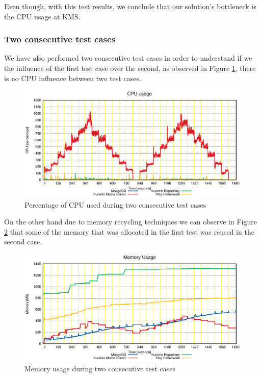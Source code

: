 Even though, with this test results, we conclude that our solution's bottleneck is the \ac{CPU} usage at \ac{KMS}.

\subsubsection{Two consecutive test cases}


We have also performed two consecutive test cases in order to understand if we the influence of the first test case over the second, as observed in Figure \ref{fig:test_two_times_cpu}, there is no \ac{CPU} influence between two test cases.


\begin{figure}
  \centering
  \includegraphics[width=\textwidth]{stats/test_two_times_cpu.eps}
  \caption{Percentage of CPU used during two consecutive test cases}
  \label{fig:test_two_times_cpu}
\end{figure}

On the other hand due to memory recycling techniques we can observe in Figure \ref{fig:test_two_times_mem} that some of the memory that was allocated in the first test was reused in the second case.


\begin{figure}
  \centering
  \includegraphics[width=\textwidth]{stats/test_two_times_mem.eps}
  \caption{Memory usage during two consecutive test cases}
  \label{fig:test_two_times_mem}
\end{figure}


